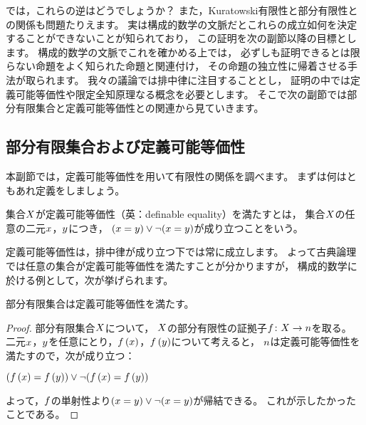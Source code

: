 では，これらの逆はどうでしょうか？
また，Kuratowski有限性と部分有限性との関係も問題たりえます。
実は構成的数学の文脈だとこれらの成立如何を決定することができないことが知られており，
この証明を次の副節以降の目標とします。
構成的数学の文脈でこれを確かめる上では，
必ずしも証明できるとは限らない命題をよく知られた命題と関連付け，
その命題の独立性に帰着させる手法が取られます。
我々の議論では排中律に注目することとし，
証明の中では定義可能等価性や限定全知原理なる概念を必要とします。
そこで次の副節では部分有限集合と定義可能等価性との関連から見ていきます。

\subsection{部分有限集合および定義可能等価性}

本副節では，定義可能等価性を用いて有限性の関係を調べます。
まずは何はともあれ定義をしましょう。

\begin{definition}
    集合\(\Set\)が定義可能等価性（英：definable equality）を満たすとは，
    集合\(\Set\)の任意の二元\(\Element\)，\(\Element<y>\)につき，
    \((\Element=\Element<y>)\OR\NOT(\Element=\Element<y>)\)が成り立つことをいう。
\end{definition}

定義可能等価性は，排中律が成り立つ下では常に成立します。
よって古典論理では任意の集合が定義可能等価性を満たすことが分かりますが，
構成的数学に於ける例として，次が挙げられます。

\begin{proposition}\label{prop::all_subfinite_has_definable_equality}
    部分有限集合は定義可能等価性を満たす。
\end{proposition}

\begin{proof}
    部分有限集合\(\Set\)について，
    \(\Set\)の部分有限性の証拠子\(\FunctionStyle{\Map}{\Set}{\NaturalNumber}\)を取る。
    二元\(\Element\)，\(\Element<y>\)を任意にとり，\(\Map(\Element)\)，\(\Map(\Element<y>)\)について考えると，
    \(\NaturalNumber\)は定義可能等価性を満たすので，次が成り立つ：
    \begin{center}
        \((\Map(\Element)=\Map(\Element<y>))\OR\NOT(\Map(\Element)=\Map(\Element<y>))\)
    \end{center}
    よって，\(\Map\)の単射性より\((\Element=\Element<y>)\OR\NOT(\Element=\Element<y>)\)が帰結できる。
    これが示したかったことである。
\end{proof}

